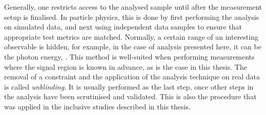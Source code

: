 Generally, one restricts access to the analysed sample until after the measurement setup is finalised.
In particle physics, this is done by first performing the analysis on simulated data, 
and next using independent data samples to ensure that appropriate test metrics are matched.
Normally, a certain range of an interesting observable is hidden, for example, in the case of \BtoXsgamma analysis presented here, it can be the photon energy, \Egamma.
This method is well-suited when performing measurements where the signal region is known in advance, as is the case in this thesis.
The removal of a constraint and the application of the analysis technique on real data is called \textit{unblinding}.
It is usually performed as the last step, once other steps in the analysis have been scrutinised and validated.
This is also the procedure that was applied in the inclusive \BtoXsgamma studies described in this thesis.